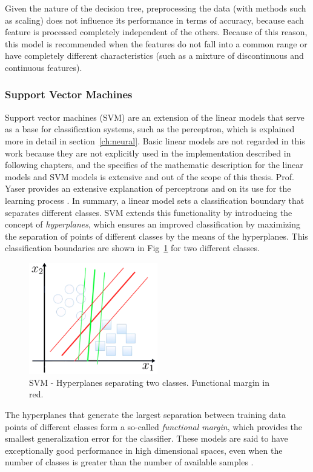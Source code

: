 Given the nature of the decision tree, preprocessing the data (with methods such as scaling) does not influence its performance in terms of accuracy, because each feature is processed completely independent of the others. Because of this reason, this model is recommended when the features do not fall into a common range or have completely different characteristics (such as a mixture of discontinuous and continuous features).

\subsubsection{Support Vector Machines}
Support vector machines (SVM) are an extension of the linear models that serve as a base for classification systems, such as the perceptron, which is explained more in detail in section~\ref{ch:neural}. Basic linear models are not regarded in this work because they are not explicitly used in the implementation described in following chapters, and the specifics of the mathematic description for the linear models and \ac{SVM} models is extensive and out of the scope of this thesis. Prof. Yaser provides an extensive explanation of perceptrons and on its use for the learning process \cite{Yaser}. In summary, a linear model sets a classification boundary that separates different classes. \ac{SVM} extends this functionality by introducing the concept of \emph{hyperplanes}, which ensures an improved classification by maximizing the separation of points of different classes by the means of the hyperplanes. This classification boundaries are shown in Fig~\ref{fig:svm} for two different classes.

\begin{figure}[!htb]
    \centering
      \includegraphics[width=0.5\textwidth]{figures/svm}
      \caption{\ac{SVM} - Hyperplanes separating two classes. Functional margin in red.}
      \label{fig:svm}
\end{figure}
The hyperplanes that generate the largest separation between training data points of different classes form a so-called \emph{functional margin}, which provides the smallest generalization error for the classifier. These models are said to have exceptionally good performance in high dimensional spaces, even when the number of classes is greater than the number of available samples \cite{SKLEARN}.

